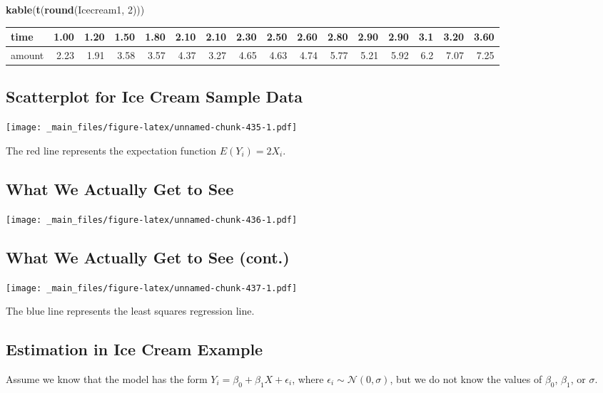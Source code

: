 \documentclass[]{book}
\newenvironment{Shaded}{\begin{snugshade}}{\end{snugshade}}
\newcommand{\KeywordTok}[1]{\textcolor[rgb]{0.13,0.29,0.53}{\textbf{#1}}}
\newcommand{\DecValTok}[1]{\textcolor[rgb]{0.00,0.00,0.81}{#1}}
\newcommand{\NormalTok}[1]{#1}
\begin{document}
\begin{Shaded}
\begin{Highlighting}[]
\KeywordTok{kable}\NormalTok{(}\KeywordTok{t}\NormalTok{(}\KeywordTok{round}\NormalTok{(Icecream1, }\DecValTok{2}\NormalTok{)))}
\end{Highlighting}
\end{Shaded}

\begin{tabular}{l|r|r|r|r|r|r|r|r|r|r|r|r|r|r|r}
\hline
time & 1.00 & 1.20 & 1.50 & 1.80 & 2.10 & 2.10 & 2.30 & 2.50 & 2.60 & 2.80 & 2.90 & 2.90 & 3.1 & 3.20 & 3.60\\
\hline
amount & 2.23 & 1.91 & 3.58 & 3.57 & 4.37 & 3.27 & 4.65 & 4.63 & 4.74 & 5.77 & 5.21 & 5.92 & 6.2 & 7.07 & 7.25\\
\hline
\end{tabular}

\subsection{Scatterplot for Ice Cream Sample
Data}\label{scatterplot-for-ice-cream-sample-data}

\texttt{[image: \_main\_files/figure-latex/unnamed-chunk-435-1.pdf]}

The red line represents the expectation function \(E(Y_i) = 2X_i\).

\subsection{What We Actually Get to
See}\label{what-we-actually-get-to-see}

\texttt{[image: \_main\_files/figure-latex/unnamed-chunk-436-1.pdf]}

\subsection{What We Actually Get to See
(cont.)}\label{what-we-actually-get-to-see-cont.}

\texttt{[image: \_main\_files/figure-latex/unnamed-chunk-437-1.pdf]}

The blue line represents the least squares regression line.

\subsection{Estimation in Ice Cream
Example}\label{estimation-in-ice-cream-example}

Assume we know that the model has the form
\(Y_i=\beta_0 + \beta_1X + \epsilon_i\), where
\(\epsilon_i \sim \mathcal{N}(0,\sigma)\), but we do not know the values
of \(\beta_0\), \(\beta_1\), or \(\sigma\).
\end{document}
